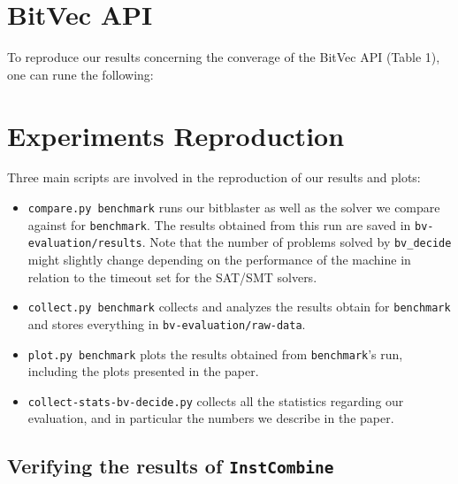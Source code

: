 \documentclass[acmlarge, nonacm]{acmart}
\begin{document}

\section{BitVec API}
To reproduce our results concerning the converage of the BitVec API (Table 1), one can rune the following: 

\section{Experiments Reproduction}

Three main scripts are involved in the reproduction of our results and plots:
\begin{itemize}
  \item \texttt{compare.py benchmark} runs our bitblaster as well as the solver we compare against for \texttt{benchmark}. The results obtained from this run are saved in \texttt{bv-evaluation/results}. Note that the number of problems solved by \texttt{bv\_decide} might slightly change depending on the performance of the machine in relation to the timeout set for the SAT/SMT solvers.
  \item \texttt{collect.py benchmark} collects and analyzes the results obtain for \texttt{benchmark} and stores everything in \texttt{bv-evaluation/raw-data}. 
  \item \texttt{plot.py benchmark} plots the results obtained from \texttt{benchmark}'s run, including the plots presented in the paper. 
  \item \texttt{collect-stats-bv-decide.py} collects all the statistics regarding our evaluation, and in particular the numbers we describe in the paper.
\end{itemize}

\subsection{Verifying the results of \texttt{InstCombine}}
\end{document}
